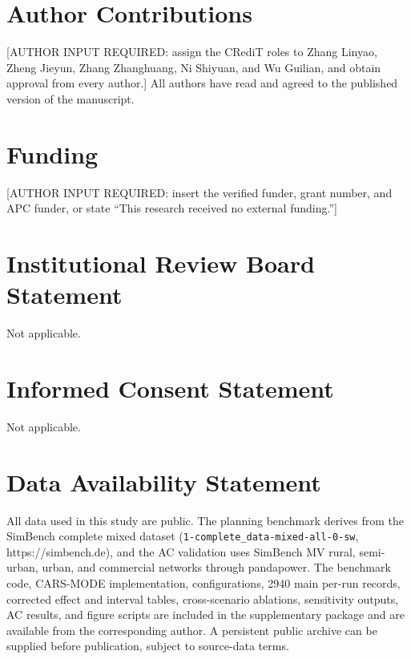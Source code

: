 \documentclass[
  10pt,
  a4paper,
]{article}
\begin{document}
\section{Author Contributions}\label{author-contributions}

{[}AUTHOR INPUT REQUIRED: assign the CRediT roles to Zhang Linyao,
Zheng Jieyun, Zhang Zhanghuang, Ni Shiyuan, and Wu Guilian, and obtain
approval from every author.{]} All authors have read and agreed to the
published version of the manuscript.

\section{Funding}\label{funding}

{[}AUTHOR INPUT REQUIRED: insert the verified funder, grant number, and
APC funder, or state ``This research received no external funding.''{]}

\section{Institutional Review Board
Statement}\label{institutional-review-board-statement}

Not applicable.

\section{Informed Consent Statement}\label{informed-consent-statement}

Not applicable.

\section{Data Availability Statement}\label{data-availability-statement}

All data used in this study are public. The planning benchmark derives
from the SimBench complete mixed dataset
(\texttt{1-complete\_data-mixed-all-0-sw}, https://simbench.de), and the
AC validation uses SimBench MV rural, semi-urban, urban, and commercial
networks through pandapower. The benchmark code, CARS-MODE
implementation, configurations, 2940 main per-run records, corrected
effect and interval tables, cross-scenario ablations, sensitivity
outputs, AC results, and figure scripts are included in the
supplementary package and are available from the corresponding author. A
persistent public archive can be supplied before publication, subject to
source-data terms.
\end{document}
